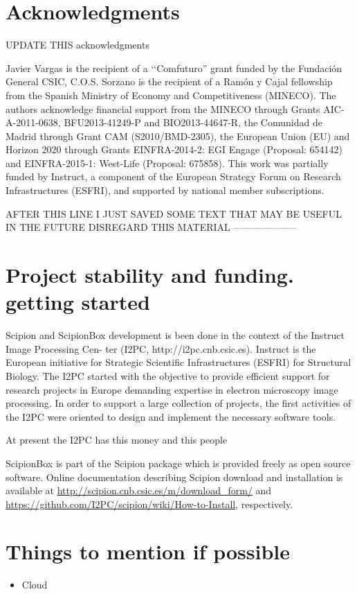 \section{Acknowledgments}

UPDATE THIS acknowledgments

Javier Vargas is the recipient of a ‘‘Comfuturo” grant funded by
the Fundación General CSIC, C.O.S. Sorzano is the recipient of a
Ramón y Cajal fellowship from the Spanish Ministry of Economy
and Competitiveness (MINECO). The authors acknowledge financial
support from the MINECO through Grants AIC-A-2011-0638,
BFU2013-41249-P and BIO2013-44647-R, the Comunidad de
Madrid through Grant CAM (S2010/BMD-2305), the European
Union (EU) and Horizon 2020 through Grants EINFRA-2014-2:
EGI Engage (Proposal: 654142) and EINFRA-2015-1: West-Life
(Proposal: 675858).
This work was partially funded by Instruct, a component of the
European Strategy Forum on Research Infrastructures (ESFRI), and
supported by national member subscriptions.




    AFTER THIS LINE I JUST SAVED SOME TEXT THAT MAY BE USEFUL IN THE FUTURE DISREGARD THIS MATERIAL
   --------------------
   


\section{Project stability and funding. getting started}


Scipion and ScipionBox development is been done in the context of the Instruct Image Processing Cen-
ter (I2PC, http://i2pc.cnb.csic.es). Instruct is the European initiative for Strategic
Scientific Infrastructures (ESFRI) for Structural Biology. The I2PC started with the objective 
to provide efficient support for research projects in Europe demanding expertise in 
electron microscopy image processing. In order to support a large collection
of projects, the first activities of the I2PC were oriented to design and implement the
necessary software tools. 

At present the I2PC has this money and this people

ScipionBox is part of the Scipion package which is provided 
freely as open source software. Online documentation
describing Scipion download and installation is available
at \url{http://scipion.cnb.csic.es/m/download_form/} and \url{https://github.com/I2PC/scipion/wiki/How-to-Install}, respectively.

\section{Things to mention if possible}
\begin{itemize}
 \item Cloud
\end{itemize}
